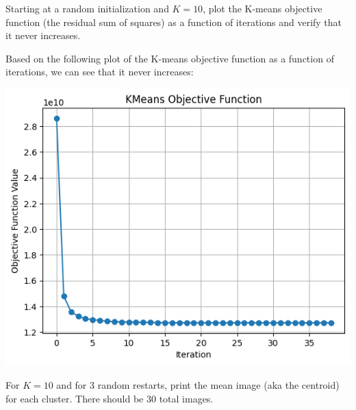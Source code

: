 \documentclass[expanded]{lkx_pset}
\begin{document}
\begin{parts}
	\begin{part}{1} Starting at a random initialization and $K = 10$, plot the
		K-means objective function (the residual sum of squares) as a
		function of iterations and verify that it never increases.
	\end{part}

	Based on the following plot of the K-means objective function as a function of iterations, we can see that it never increases:

	\begin{center}
		\includegraphics[scale=0.7]{figures/kmeans-objective.png}
	\end{center}

	\pagebreak
	\begin{part}{2} For $K=10$ and for 3 random restarts, print the mean image (aka
		the centroid) for each cluster. There should be 30 total images.
	\end{part}


\end{parts}
\end{document}
